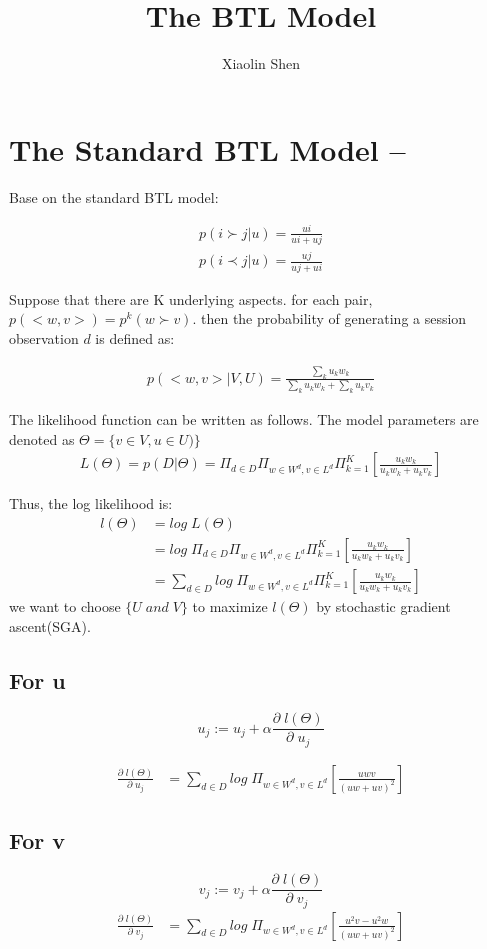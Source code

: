 \documentclass{article}
\title{The BTL Model}
\author{Xiaolin Shen}
\begin{document}
\maketitle


\section{The Standard BTL Model --}
Base on the standard BTL model:

\begin{align*}
	p(i \succ j |u)=\frac{ui}{ui+ uj} \\
	p(i \prec j |u)=\frac{uj}{uj+ ui}
\end{align*}

 Suppose that there are K underlying aspects. for each pair, $p(<w,v>) = p^k(w\succ v) $. then the probability of generating a session observation $d$ is defined as:

\begin{align}
p(<w,v>|V,U)
= \frac{\sum_k u_k w_k}{\sum_k u_k w_k+ \sum_k u_k v_k}
\end{align}

The likelihood function can be written as follows. The model parameters are denoted as $ \Theta = \{ v \in V ,u \in U ) \}$
\begin{align}
L(\Theta)=p(D|\Theta)
=\Pi_{d \in D} \Pi_{w\in W^d, v\in L^d} \Pi_{k=1}^{K}[{\frac{u_k w_k}{u_k w_k+u_k v_k}}]
\end{align}

Thus, the log likelihood is:
\begin{align}
l(\Theta) &= log \; L(\Theta) \\
& =log \; \Pi_{d \in D} \Pi_{w\in W^d, v\in L^d} \Pi_{k=1}^{K}[{\frac{u_k w_k}{u_k w_k+u_k v_k}}]\\ \nonumber
& =\sum_{d \in D}  log \; \Pi_{w\in W^d, v\in L^d} \Pi_{k=1}^{K}[{\frac{u_k w_k}{u_k w_k+u_k v_k}}]
\end{align}
 we want to choose $\{ U \; and \; V\}$ to maximize $ l(\Theta) $ by stochastic gradient ascent(SGA).

\subsection{For u}
$$u_j:= u_j + \alpha \frac{\partial \;l(\Theta) }{\partial \;u_j}$$

\begin{align}
\frac{\partial \;l(\Theta) }{\partial \;u_j}
 &= \sum_{d \in D}  log \; \Pi_{w\in W^d, v\in L^d} [\frac{uwv}{(uw+uv)^2}]
\end{align}

\subsection{For v}

$$v_j:= v_j + \alpha \frac{\partial \;l(\Theta) }{\partial \;v_j}$$
\begin{align}
\frac{\partial \;l(\Theta) }{\partial \;v_j}
&= \sum_{d \in D}  log \; \Pi_{w\in W^d, v\in L^d} [ \frac{u^2 v -  u^2 w}{(uw+uv)^2}]
\end{align}
\end{document}
